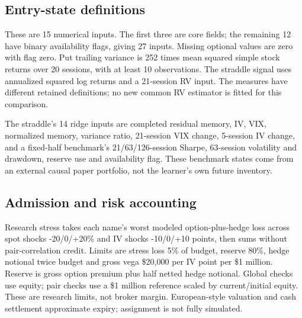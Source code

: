 \documentclass[11pt,letterpaper]{article}
\begin{document}
\subsection*{Entry-state definitions}
\begin{center}\small{}\end{center}
These are 15 numerical inputs. The first three are core fields; the remaining 12 have binary availability flags, giving 27 inputs. Missing optional values are zero with flag zero. Put trailing variance is 252 times mean squared simple stock returns over 20 sessions, with at least 10 observations. The straddle signal uses annualized squared log returns and a 21-session RV input. The measures have different retained definitions; no new common RV estimator is fitted for this comparison.

The straddle's 14 ridge inputs are completed residual memory, IV, VIX, normalized memory, variance ratio, 21-session VIX change, 5-session IV change, and a fixed-half benchmark's 21/63/126-session Sharpe, 63-session volatility and drawdown, reserve use and availability flag. These benchmark states come from an external causal paper portfolio, not the learner's own future inventory.

\subsection*{Admission and risk accounting}
Research stress takes each name's worst modeled option-plus-hedge loss across spot shocks -20/0/+20\% and IV shocks -10/0/+10 points, then sums without pair-correlation credit. Limits are stress loss 5\% of budget, reserve 80\%, hedge notional twice budget and gross vega \$20,000 per IV point per \$1 million. Reserve is gross option premium plus half netted hedge notional. Global checks use equity; pair checks use a \$1 million reference scaled by current/initial equity. These are research limits, not broker margin. European-style valuation and cash settlement approximate expiry; assignment is not fully simulated.
\end{document}
